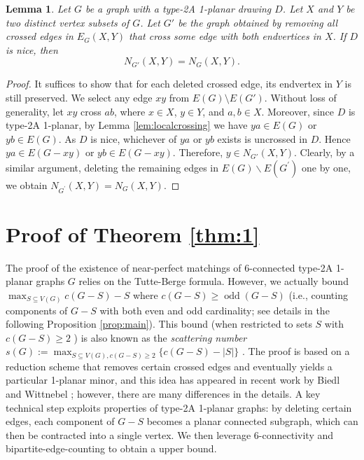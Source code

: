 \documentclass[12pt,a4paper]{article}
\newtheorem{lem}{Lemma}[section]
\begin{document}





\begin{lem}\label{lem:asso}
Let $G$ be a graph with a type-2A 1-planar drawing $D$. Let $X$ and $Y$ be two distinct vertex subsets of $G$. Let $G'$ be the graph obtained by removing all crossed edges in $E_G(X,Y)$ that cross some edge with both endvertices in $X$. If $D$ is nice, then 
\[
N_{G'}(X,Y) = N_{G}(X,Y).
\]
\end{lem}

\begin{proof}
It suffices to show that for each deleted crossed edge, its endvertex in $Y$ is still preserved.
We select any edge $xy$ from $E(G)\setminus E(G')$. Without loss of generality, let $xy$ cross $ab$, where $x \in X$, $y \in Y$, and $a,b \in X$.  
Moreover, since $D$ is type-2A 1-planar, by Lemma \ref{lem:localcrossing} we have $ya \in E(G)$ or $yb \in E(G)$. As $D$ is nice, whichever of $ya$ or $yb$ exists is uncrossed in $D$. Hence $ya \in E(G-xy)$ or $yb \in E(G-xy)$. Therefore, $y \in N_{G'}(X,Y)$. Clearly, by   a similar argument, deleting the remaining edges in $E(G) \backslash E\left(G^{\prime}\right)$ one by one, we obtain $N_{G^{\prime}}(X, Y)=N_G(X, Y)$.
\end{proof}








\section{Proof of Theorem \ref{thm:1}}


 The proof of the existence of near-perfect matchings of 6-connected type-2A 1-planar graphs $G$ relies on the Tutte-Berge formula. However, we actually bound  $\max_{S\subseteq V(G)} c(G-S)-S$  where $c(G - S) \geq \operatorname{odd}(G - S)$ (i.e., counting components of $G-S$ with both even and odd cardinality; see details in the following Proposition \ref{prop:main}). This bound (when restricted to sets $S$ with $c(G - S) \geq 2$ ) is also known as the \emph{scattering number} $s(G):=\max _{S \subseteq V(G), c(G - S) \geq 2}\{c(G - S)-|S|\}$ \cite{MR0491356}. The proof is based on a reduction scheme that removes certain crossed edges and eventually yields a particular 1-planar minor, and this idea has appeared in recent work by Biedl and Wittnebel \cite{MR4813988}; however, there are many differences in the details.  A key technical step exploits properties of type-2A 1-planar graphs: by deleting certain edges, each component of $G-S$ becomes a planar connected subgraph, which can then be contracted into a single vertex. We then leverage 6-connectivity and bipartite-edge-counting to obtain a  upper bound.
 
\end{document}
